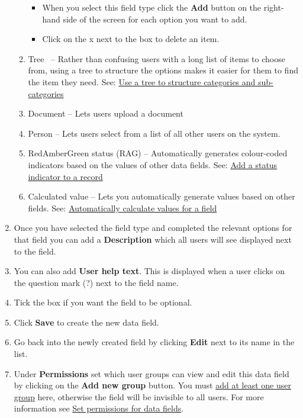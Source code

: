 \documentclass{ctrlo-int-toc}
\begin{document}
\begin{admin}
\begin{enumerate}
\begin{enumerate}
\begin{itemize}
    \item When you select this field type click the \textbf{Add} button on the right-hand side of the screen for each option you want to add.
\item Click on the x next to the box to delete an item. 
\end{itemize}
\item Tree \ {}-- Rather than confusing users with a long list of items to choose from, using a tree to structure the options makes it easier for them to find the item they need. See: \hyperref[subsec:fieldtree]{Use a tree to structure categories and sub-categories}
\item Document {}-- Lets users upload a document
\item Person {}-- Lets users select from a list of all other users on the system.
\item RedAmberGreen status (RAG) \--- Automatically generates colour-coded indicators based on the values of other data fields. See: \hyperref[subsec:fieldrag]{Add a status indicator to a record}
\item Calculated value {}-- Lets you automatically generate values based on other fields. See: \hyperref[subsec:fieldcalc]{Automatically calculate values for a field}
\end{enumerate}
\item Once you have selected the field type and completed the relevant options for that field you can add a \textbf{Description} which all users will see displayed next to the field. 
\item You can also add \textbf{User help text}. This is displayed when a user clicks on the question mark (?) next to the field name. 
\item Tick the box if you want the field to be optional.
\item Click \textbf{Save} to create the new data field. 
\item Go back into the newly created field by clicking \textbf{Edit} next to its name in the list.
\item Under \textbf{Permissions} set which user groups can view and edit this data field by clicking on the \textbf{Add new group} button. You must \hyperref[sec:usergroups]{add at least one user group} here, otherwise the field will be invisible to all users. For more information see \hyperref[subsec:setfieldperms]{Set permissions for data fields}.
\end{enumerate}


\end{admin}
\end{document}
